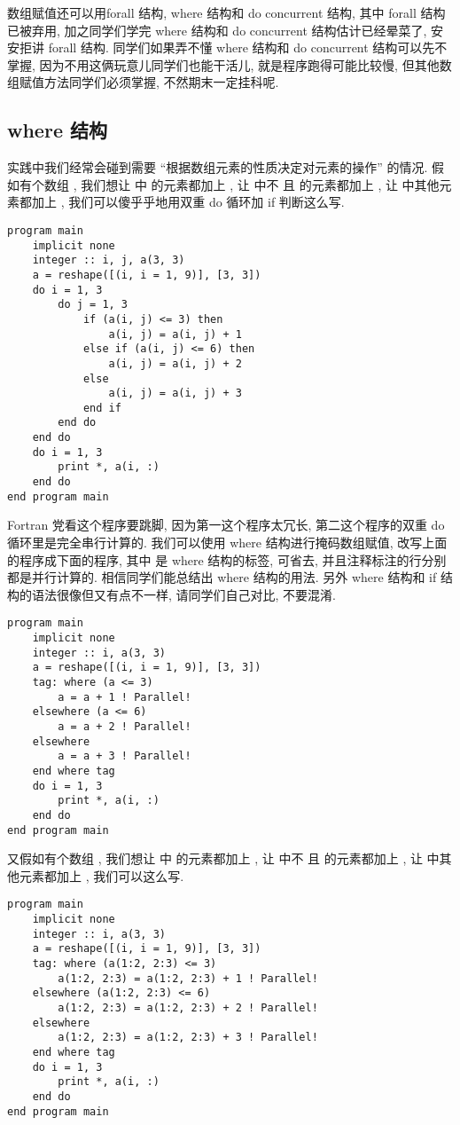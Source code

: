 数组赋值还可以用forall 结构, where 结构和 do concurrent 结构, 其中 forall 结构已被弃用, 加之同学们学完 where 结构和 do concurrent 结构估计已经晕菜了, 安安拒讲 forall 结构. 同学们如果弄不懂 where 结构和 do concurrent 结构可以先不掌握, 因为不用这俩玩意儿同学们也能干活儿, 就是程序跑得可能比较慢, 但其他数组赋值方法同学们必须掌握, 不然期末一定挂科呢.

\subsection{where 结构}

实践中我们经常会碰到需要 ``根据数组元素的性质决定对元素的操作'' 的情况. 假如有个数组 , 我们想让  中  的元素都加上 , 让  中不  且  的元素都加上 , 让  中其他元素都加上 , 我们可以傻乎乎地用双重 do 循环加 if 判断这么写.
\begin{lstlisting}
program main
    implicit none
    integer :: i, j, a(3, 3)
    a = reshape([(i, i = 1, 9)], [3, 3])
    do i = 1, 3
        do j = 1, 3
            if (a(i, j) <= 3) then
                a(i, j) = a(i, j) + 1
            else if (a(i, j) <= 6) then
                a(i, j) = a(i, j) + 2
            else
                a(i, j) = a(i, j) + 3
            end if
        end do
    end do
    do i = 1, 3
        print *, a(i, :)
    end do
end program main
\end{lstlisting}
Fortran 党看这个程序要跳脚, 因为第一这个程序太冗长, 第二这个程序的双重 do 循环里是完全串行计算的. 我们可以使用 where 结构进行掩码数组赋值, 改写上面的程序成下面的程序, 其中  是 where 结构的标签, 可省去, 并且注释标注的行分别都是并行计算的. 相信同学们能总结出 where 结构的用法. 另外 where 结构和 if 结构的语法很像但又有点不一样, 请同学们自己对比, 不要混淆.
\begin{lstlisting}
program main
    implicit none
    integer :: i, a(3, 3)
    a = reshape([(i, i = 1, 9)], [3, 3])
    tag: where (a <= 3)
        a = a + 1 ! Parallel!
    elsewhere (a <= 6)
        a = a + 2 ! Parallel!
    elsewhere
        a = a + 3 ! Parallel!
    end where tag
    do i = 1, 3
        print *, a(i, :)
    end do
end program main
\end{lstlisting}
又假如有个数组 , 我们想让  中  的元素都加上 , 让  中不  且  的元素都加上 , 让  中其他元素都加上 , 我们可以这么写.
\begin{lstlisting}
program main
    implicit none
    integer :: i, a(3, 3)
    a = reshape([(i, i = 1, 9)], [3, 3])
    tag: where (a(1:2, 2:3) <= 3)
        a(1:2, 2:3) = a(1:2, 2:3) + 1 ! Parallel!
    elsewhere (a(1:2, 2:3) <= 6)
        a(1:2, 2:3) = a(1:2, 2:3) + 2 ! Parallel!
    elsewhere
        a(1:2, 2:3) = a(1:2, 2:3) + 3 ! Parallel!
    end where tag
    do i = 1, 3
        print *, a(i, :)
    end do
end program main
\end{lstlisting}
